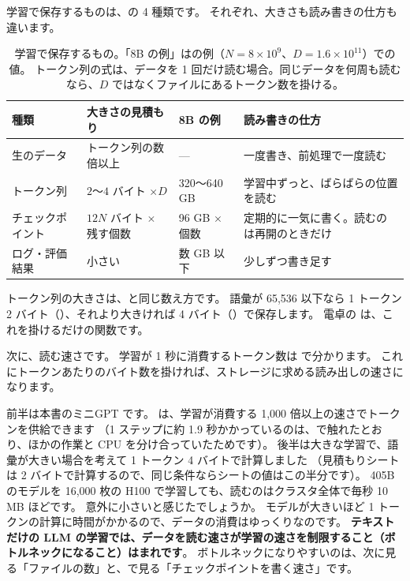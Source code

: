 学習で保存するものは、の 4 種類です。
それぞれ、大きさも読み書きの仕方も違います。

\begin{table}[tbp]
\centering
\caption{学習で保存するもの。「8B の例」はの例（$N=8\times10^{9}$、$D=1.6\times10^{11}$）での値。
トークン列の式は、データを 1 回だけ読む場合。同じデータを何周も読むなら、$D$ ではなくファイルにあるトークン数を掛ける。}
\label{tab:infra-store}
\footnotesize
\begin{tabular}{l>{\raggedright\arraybackslash}p{27mm}l>{\raggedright\arraybackslash}p{40mm}}
\toprule
種類 & 大きさの見積もり & 8B の例 & 読み書きの仕方 \\
\midrule
生のデータ & トークン列の数倍以上 & --- & 一度書き、前処理で一度読む \\
トークン列 & $2$〜$4$ バイト $\times D$ & 320〜640 GB & 学習中ずっと、ばらばらの位置を読む \\
チェックポイント & $12N$ バイト $\times$ 残す個数 & 96 GB $\times$ 個数 & 定期的に一気に書く。読むのは再開のときだけ \\
ログ・評価結果 & 小さい & 数 GB 以下 & 少しずつ書き足す \\
\bottomrule
\end{tabular}
\end{table}

トークン列の大きさは、と同じ数え方です。
語彙が 65,536 以下なら 1 トークン 2 バイト（）、それより大きければ 4 バイト（）で保存します。
電卓の  は、これを掛けるだけの関数です。

次に、読む速さです。
学習が 1 秒に消費するトークン数は  で分かります。
これにトークンあたりのバイト数を掛ければ、ストレージに求める読み出しの速さになります。


前半は本書のミニGPT です。
 は、学習が消費する 1,000 倍以上の速さでトークンを供給できます
（1 ステップに約 1.9 秒かかっているのは、で触れたとおり、ほかの作業と CPU を分け合っていたためです）。
後半は大きな学習で、語彙が大きい場合を考えて 1 トークン 4 バイトで計算しました
（見積もりシートは 2 バイトで計算するので、同じ条件ならシートの値はこの半分です）。
405B のモデルを 16,000 枚の H100 で学習しても、読むのはクラスタ全体で毎秒 10 MB ほどです。
意外に小さいと感じたでしょうか。
モデルが大きいほど 1 トークンの計算に時間がかかるので、データの消費はゆっくりなのです。
\textbf{テキストだけの LLM の学習では、データを読む速さが学習の速さを制限すること（ボトルネックになること）はまれです}。
ボトルネックになりやすいのは、次に見る「ファイルの数」と、で見る「チェックポイントを書く速さ」です。

